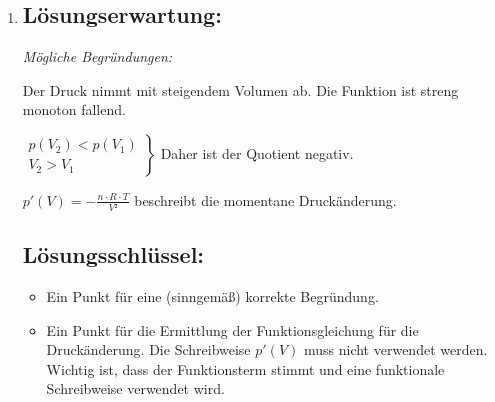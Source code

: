 \begin{langesbeispiel}
{\begin{enumerate}
	\item \subsection{Lösungserwartung:}
		\textit{Mögliche Begründungen:}
	
	Der Druck nimmt mit steigendem Volumen ab. Die Funktion ist streng monoton fallend.\leer
	
$\left.\begin{array}{r}p(V_2)<p(V_1)\\V_2>V_1\end{array}\right\}$ Daher ist der Quotient negativ.\leer

$p'(V)=-\frac{n\cdot R\cdot T}{V²}$ beschreibt die momentane Druckänderung.

	\subsection{Lösungsschlüssel:}
	
\begin{itemize}
	\item Ein Punkt für eine (sinngemäß) korrekte Begründung.
	\item  Ein Punkt für die Ermittlung der Funktionsgleichung für die Druckänderung. Die Schreibweise $p'(V)$ muss nicht verwendet werden. Wichtig ist, dass der Funktionsterm stimmt und eine funktionale Schreibweise verwendet wird.
\end{itemize}
\end{enumerate}}
		\end{langesbeispiel}